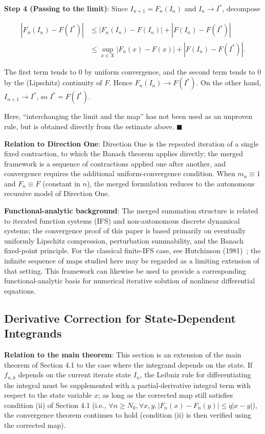 \documentclass[11pt,a4paper]{amsart}
\begin{document}
\textbf{Step 4 (Passing to the limit)}: Since $I_{n+1} = F_n(I_n)$ and $I_n \to I^*$, decompose

\begin{equation}
\begin{aligned}
|F_n(I_n) - F(I^*)| &\le |F_n(I_n) - F(I_n)| + |F(I_n) - F(I^*)| \\
&\le \sup_{x\in X}|F_n(x) - F(x)| + |F(I_n) - F(I^*)|.
\end{aligned}
\end{equation}

The first term tends to $0$ by uniform convergence, and the second term tends to $0$ by the (Lipschitz) continuity of $F$. Hence $F_n(I_n) \to F(I^*)$. On the other hand, $I_{n+1} \to I^*$, so $I^* = F(I^*)$.

Here, ``interchanging the limit and the map'' has not been used as an unproven rule, but is obtained directly from the estimate above. $\blacksquare$

\textbf{Relation to Direction One}: Direction One is the repeated iteration of a single fixed contraction, to which the Banach theorem applies directly; the merged framework is a sequence of contractions applied one after another, and convergence requires the additional uniform-convergence condition. When $m_n \equiv 1$ and $F_n \equiv F$ (constant in $n$), the merged formulation reduces to the autonomous recursive model of Direction One.

\textbf{Functional-analytic background}: The merged summation structure is related to iterated function systems (IFS) and non-autonomous discrete dynamical systems; the convergence proof of this paper is based primarily on eventually uniformly Lipschitz compression, perturbation summability, and the Banach fixed-point principle. For the classical finite-IFS case, see Hutchinson (1981)~\cite{hutchinson1981}; the infinite sequence of maps studied here may be regarded as a limiting extension of that setting. This framework can likewise be used to provide a corresponding functional-analytic basis for numerical iterative solution of nonlinear differential equations.

\subsection{Derivative Correction for State-Dependent Integrands}

\textbf{Relation to the main theorem}: This section is an extension of the main theorem of Section 4.1 to the case where the integrand depends on the state. If $f_{n,k}$ depends on the current iterate state $I_n$, the Leibniz rule for differentiating the integral must be supplemented with a partial-derivative integral term with respect to the state variable $x$; as long as the corrected map still satisfies condition (ii) of Section 4.1 (i.e., $\forall n \ge N_0, \forall x,y, |F_n(x) - F_n(y)| \le q|x - y|$), the convergence theorem continues to hold (condition (ii) is then verified using the corrected map).
\end{document}
